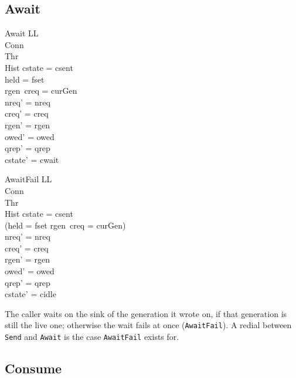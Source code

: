 \documentclass[a4paper,10pt,fleqn]{article}
\begin{document}
\subsection{Await}

\begin{schema}{Await}
  \Delta LL \\
  \Xi Conn \\
  \Xi Thr \\
  \Xi Hist
\where
  cstate = csent \\
  held = fset \\
  rgen~creq = curGen \\
  nreq' = nreq \\
  creq' = creq \\
  rgen' = rgen \\
  owed' = owed \\
  qrep' = qrep \\
  cstate' = cwait
\end{schema}

\begin{schema}{AwaitFail}
  \Delta LL \\
  \Xi Conn \\
  \Xi Thr \\
  \Xi Hist
\where
  cstate = csent \\
  \lnot (held = fset \land rgen~creq = curGen) \\
  nreq' = nreq \\
  creq' = creq \\
  rgen' = rgen \\
  owed' = owed \\
  qrep' = qrep \\
  cstate' = cidle
\end{schema}
The caller waits on the sink of the generation it wrote on, if that
generation is still the live one; otherwise the wait fails at once
(\texttt{AwaitFail}).  A redial between \texttt{Send} and \texttt{Await} is
the case \texttt{AwaitFail} exists for.

\subsection{Consume}
\end{document}
